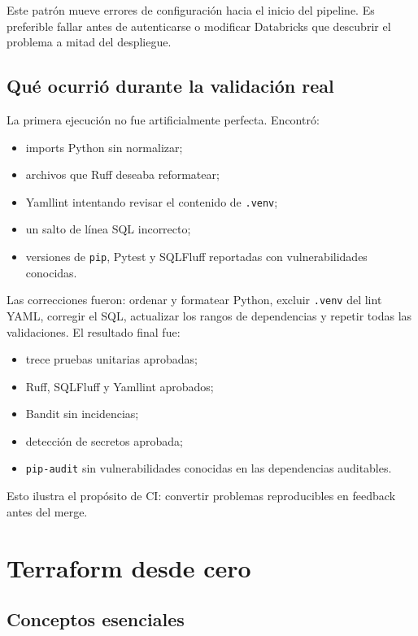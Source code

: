 \documentclass[11pt,a4paper]{article}
\begin{document}
Este patrón mueve errores de configuración hacia el inicio del pipeline. Es preferible fallar antes
de autenticarse o modificar Databricks que descubrir el problema a mitad del despliegue.

\subsection{Qué ocurrió durante la validación real}

La primera ejecución no fue artificialmente perfecta. Encontró:

\begin{itemize}
  \item imports Python sin normalizar;
  \item archivos que Ruff deseaba reformatear;
  \item Yamllint intentando revisar el contenido de \texttt{.venv};
  \item un salto de línea SQL incorrecto;
  \item versiones de \texttt{pip}, Pytest y SQLFluff reportadas con vulnerabilidades conocidas.
\end{itemize}

Las correcciones fueron: ordenar y formatear Python, excluir \texttt{.venv} del lint YAML, corregir el
SQL, actualizar los rangos de dependencias y repetir todas las validaciones. El resultado final fue:

\begin{itemize}
  \item trece pruebas unitarias aprobadas;
  \item Ruff, SQLFluff y Yamllint aprobados;
  \item Bandit sin incidencias;
  \item detección de secretos aprobada;
  \item \texttt{pip-audit} sin vulnerabilidades conocidas en las dependencias auditables.
\end{itemize}

Esto ilustra el propósito de CI: convertir problemas reproducibles en feedback antes del merge.

\section{Terraform desde cero}

\subsection{Conceptos esenciales}
\end{document}
